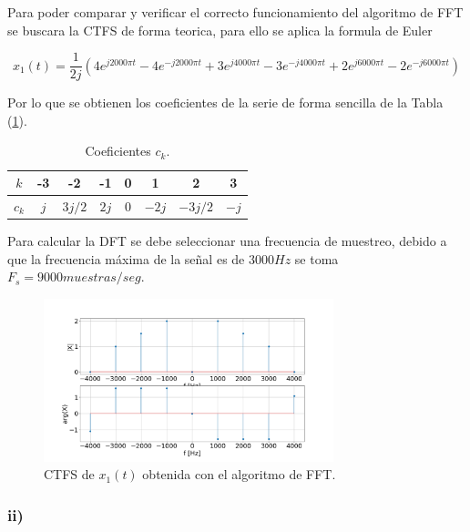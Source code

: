 \documentclass{article}
\begin{document}
    Para poder comparar y verificar el correcto funcionamiento del algoritmo de FFT
    se buscara la CTFS de forma teorica, para ello se aplica la formula de Euler
    
    \begin{equation}
        x_1(t) = \frac{1}{2j} ( 4e^{j2000 \pi t} - 4e^{-j2000 \pi t}  +3e^{j4000 \pi t} - 3e^{-j4000 \pi t} +2e^{j6000 \pi t} - 2e^{-j6000 \pi t} )
    \end{equation}

    

    Por lo que se obtienen los coeficientes de la serie de forma sencilla de la Tabla (\ref{tab.2gi}).

    \begin{table}[H]
        \centering
        \begin{tabular}{|c|c|c|c|c|c|c|c|}
            \hline
            $k$ & -3 & -2 & -1 & 0 & 1 & 2 & 3  \\ \hline
            $c_k$ & $j$ & $3j/2$ & $2j$ & 0 & $-2j$ & $-3j/2$ & $-j$ \\ \hline
            \end{tabular}
        \caption{Coeficientes $c_k$.} 
        \label{tab.2gi}
    \end{table}

    Para calcular la DFT se debe seleccionar una frecuencia de muestreo, debido a que la frecuencia máxima de la señal es de $3000Hz$ se toma $F_s = 9000 muestras / seg$.

    \begin{figure}[H]
        \centering
        \includegraphics[width=0.75\textwidth]{Img/punto_2_g_1.png}
        \caption{CTFS de $x_1(t)$ obtenida con el algoritmo de FFT.}
        \label{fig.2gi}
    \end{figure}
    
    \subsubsection*{ii)}
\end{document}
